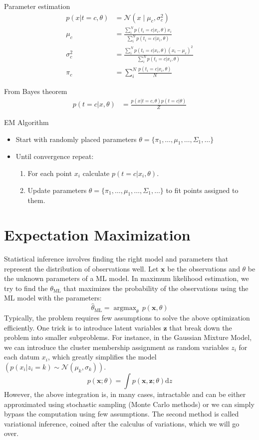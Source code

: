 \documentclass{book}
\DeclareMathOperator*{\argmax}{argmax}
\newcommand{\dd}[1]{\mathrm{d}#1}
\begin{document}
Parameter estimation
\begin{align*}
p(x | t=c, \theta) &= \mathcal{N}(x\mid \mu_c ,\sigma^{2}_{c}) \\
\mu_c  &= \frac{\sum_{i}^{N} p(t_i = c | x_i, \theta) x_i}{\sum_{i}^{N} p(t_i = c | x_i, \theta)} \\
\sigma^{2}_{c} &= \frac{\sum_{i}^{N} p(t_i = c | x_i, \theta) (x_i - \mu_c)^2}{\sum_{i}^{N} p(t_i = c | x_i, \theta)} \\
\pi_c &= \sum_{i}^{N} \frac{ p(t_i = c | x_i, \theta)}{N}
\end{align*}

From Bayes theorem
\begin{align*}
p(t=c | x, \theta) &= \frac{p(x | t=c, \theta) p(t=c | \theta)}{Z}
\end{align*}

EM Algorithm
\begin{itemize}
\item Start with randomly placed parameters $\theta = \{ \pi_1, \dots, \mu_1, \dots, \Sigma_1, \dots \}$
\item Until convergence repeat:
\begin{enumerate}
\item For each point $x_i$ calculate $p(t=c | x_i, \theta)$.
\item Update parameters $\theta = \{ \pi_1, \dots, \mu_1, \dots, \Sigma_1, \dots \}$ to fit points assigned to them.
\end{enumerate}
\end{itemize}

\section{Expectation Maximization}

Statistical inference involves finding the right model and parameters that represent the distribution of observations well. Let $\mathbf{x}$ be the observations and $\theta$ be the unknown parameters of a ML model. In maximum likelihood estimation, we try to find the $\theta_\mathrm{ML}$
that maximizes the probability of the observations using the ML model with the parameters:
\begin{equation}
\hat{\theta}_\mathrm{ML} = \argmax_\theta \, p(\mathbf{x}, \theta)
\end{equation}
Typically, the problem requires few assumptions to solve the above optimization efficiently. One trick is to introduce latent variables $\mathbf{z}$ that break down the problem into smaller subproblems. For instance, in the Gaussian Mixture Model, we can introduce the cluster membership assignment as random variables $z_i$ for each datum $x_i$, which greatly simplifies the model
$(p(x_i|z_i=k) \sim \mathcal{N}(\mu_k,\sigma_k))$.
\begin{equation}
p(\mathbf{x};\theta)=\int p(\mathbf{x},\mathbf{z};\theta)\dd{z}
\end{equation}
However, the above integration is, in many cases, intractable and can be either approximated using stochastic sampling (Monte Carlo methods) or we can simply bypass the computation using few assumptions. The second method is called variational inference, coined after the calculus of variations, which we will go over.
\end{document}
